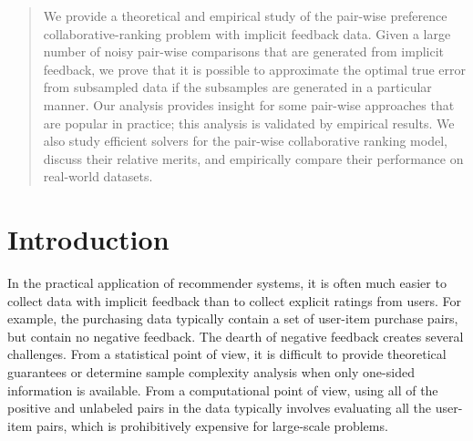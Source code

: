\documentclass{article}
\numberwithin{equation}{section}
\newtheorem{sampling strategy}{Sampling Strategy}
\begin{document}
\printAffiliationsAndNotice{}  %

\begin{abstract} 

We provide a theoretical and empirical study of the pair-wise preference collaborative-ranking problem with implicit feedback data. Given a large number of noisy pair-wise comparisons that are generated from implicit feedback, we prove that it is possible to approximate the optimal true error from subsampled data if the subsamples are generated in a particular manner. Our analysis provides insight for some pair-wise approaches that are popular in practice; this analysis is validated by empirical results. We also study  efficient solvers for the pair-wise collaborative ranking  model, discuss their relative merits, and empirically compare their performance on real-world datasets.


\end{abstract} 


\section{Introduction}
\label{sec:intro}


In the practical application of recommender systems, it is often much easier to collect data with implicit feedback than to collect explicit ratings from users.  For example, the purchasing data typically contain a set of user-item purchase pairs, but contain no negative feedback. The dearth of negative feedback creates several challenges. From a statistical point of view, it is difficult to provide theoretical guarantees or determine sample complexity analysis when only one-sided information is available. From a computational point of view, using all of the positive and unlabeled pairs in the data typically involves evaluating all the user-item pairs, which is prohibitively expensive for large-scale problems. 
\end{document}
